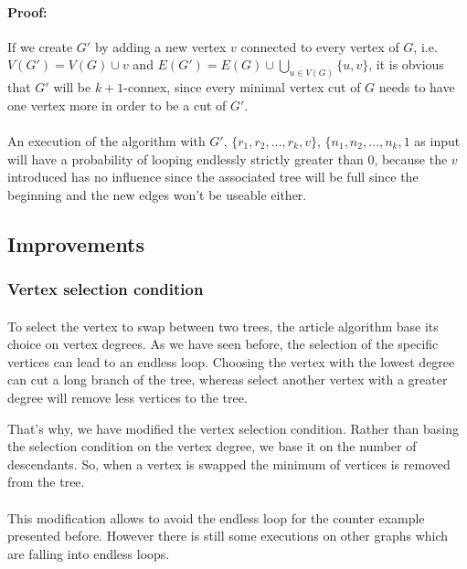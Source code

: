 \paragraph{Proof:}
If we create $G'$ by adding a new vertex $v$ connected to every vertex of $G$,
i.e. $V(G') = V(G) \cup v$ and
$E(G') = E(G) \cup \bigcup \limits_{u \in V(G)} \{u,v\}$, it is obvious that
$G'$ will be $k+1$-connex, since every minimal vertex cut of $G$ needs to have
 one vertex more in order to be a cut of $G'$.

\paragraph{}
An execution of the algorithm with $G'$, $\{r_1,r_2, \dots, r_k, v\}$,
$\{n_1,n_2, \dots, n_k, 1$ as input will have a probability of looping
endlessly strictly greater than $0$, because the $v$ introduced has no influence
since the associated tree will be full since the beginning and the new edges
won't be useable either.
\subsection{Improvements}
\subsubsection{Vertex selection condition}
\paragraph{}
To select the vertex to swap between two trees, the article algorithm base its 
choice on vertex degrees. As we have seen before, the selection of the specific
vertices can lead to an endless loop. Choosing the vertex with the lowest degree
can cut a long branch of the tree, whereas select another vertex with a greater
degree will remove less vertices to the tree.

That's why, we have modified the vertex selection condition. Rather than basing the
selection condition on the vertex degree, we base it on the number of 
descendants. So, when a vertex is swapped the minimum of vertices is removed
from the tree.

\paragraph{}
This modification allows to avoid the endless loop for the counter example
presented before. However there is still some executions on other graphs which
are falling into endless loops.

